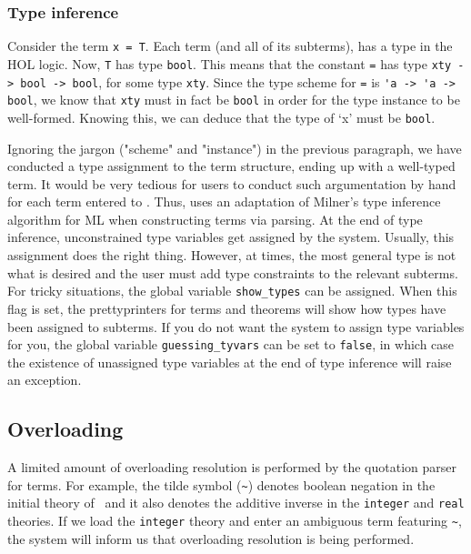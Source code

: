 {\subsubsection{Type inference}

Consider the term \verb+x = T+.  Each term (and all of its subterms),
has a type in the HOL logic. Now, \verb+T+ has type \verb+bool+. This
means that the constant \verb+=+ has type \verb+xty -> bool -> bool+,
for some type \verb+xty+. Since the type scheme for \verb+=+ is
\verb+'a -> 'a -> bool+, we know that \verb+xty+ must in fact be
\verb+bool+ in order for the type instance to be well-formed. Knowing
this, we can deduce that the type of `x' must be \verb+bool+.

Ignoring the jargon ("scheme" and "instance") in the previous
paragraph, we have conducted a type assignment to the term structure,
ending up with a well-typed term. It would be very tedious for users
to conduct such argumentation by hand for each term entered to \HOL{}.
Thus, \HOL{} uses an adaptation of Milner's type inference algorithm
for ML when constructing terms via parsing. At the end of type
inference, unconstrained type variables get assigned by the system.
Usually, this assignment does the right thing. However, at times, the
most general type is not what is desired and the user must add type
constraints to the relevant subterms. For tricky situations, the
global variable \verb+show_types+ can be assigned. When this flag is
set, the prettyprinters for terms and theorems will show how types
have been assigned to subterms. If you do not want the system to
assign type variables for you, the global variable
\verb+guessing_tyvars+ can be set to \verb+false+, in which case the
existence of unassigned type variables at the end of type inference
will raise an exception.

\subsection{Overloading}

A limited amount of overloading resolution is performed by the quotation
parser for terms. For example, the tilde symbol ({\small\verb+~+})
denotes boolean negation in the initial theory of \HOL\, and it also denotes
the additive inverse in the {\small\verb+integer+} and
{\small\verb+real+} theories. If we load the {\small\verb+integer+}
theory and enter an ambiguous term featuring {\small\verb+~+}, the
system will inform us that overloading resolution is being performed.

}
